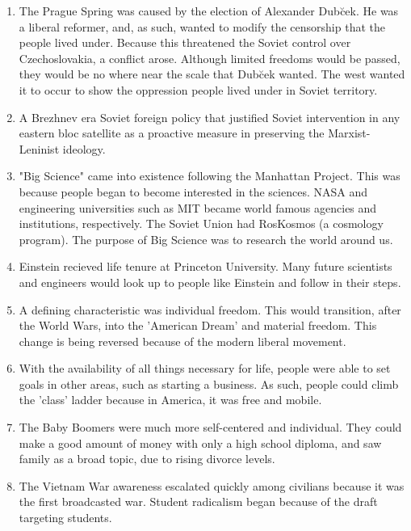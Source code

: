 \documentclass[12pt]{article}
\begin{document}
\begin{flushleft}
\begin{enumerate}
    \item The Prague Spring was caused by the election of Alexander Dub\u cek. He was a liberal reformer, and, as such, wanted to modify the censorship that the people lived under. Because this threatened the Soviet control over Czechoslovakia, a conflict arose. Although limited freedoms would be passed, they would be no where near the scale that Dub\u cek wanted. The west wanted it to occur to show the oppression people lived under in Soviet territory.

    \item A Brezhnev era Soviet foreign policy that justified Soviet intervention in any eastern bloc satellite as a proactive measure in preserving the Marxist-Leninist ideology.

    \item "Big Science" came into existence following the Manhattan Project. This was because people began to become interested in the sciences. NASA and engineering universities such as MIT became world famous agencies and institutions, respectively. The Soviet Union had RosKosmos (a cosmology program). The purpose of Big Science was to research the world around us.

    \item Einstein recieved life tenure at Princeton University. Many future scientists and engineers would look up to people like Einstein and follow in their steps.
    
    \item A defining characteristic was individual freedom. This would transition, after the World Wars, into the 'American Dream' and material freedom. This change is being reversed because of the modern liberal movement.

    \item With the availability of all things necessary for life, people were able to set goals in other areas, such as starting a business. As such, people could climb the 'class' ladder because in America, it was free and mobile.

    \item The Baby Boomers were much more self-centered and individual. They could make a good amount of money with only a high school diploma, and saw family as a broad topic, due to rising divorce levels.

    \item The Vietnam War awareness escalated quickly among civilians because it was the first broadcasted war. Student radicalism began because of the draft targeting students. 


\end{enumerate}
\end{flushleft}
\end{document}
